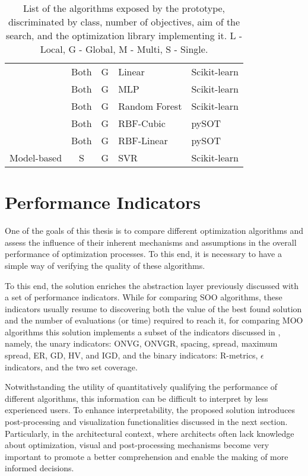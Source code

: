 \begin{table}[]
\begin{tabular}{cccll}
		& Both & G & Linear & Scikit-learn \\
		& Both & G & MLP & Scikit-learn \\
		& Both & G & Random Forest & Scikit-learn \\
		& Both & G & RBF-Cubic & pySOT \\
		& Both & G & RBF-Linear & pySOT \\
		\multirow{-10}{*}{Model-based} & S & G & SVR & Scikit-learn
	\end{tabular}
	\caption[List of the algorithms exposed by the solution's prototype]{List of the algorithms exposed by the prototype, discriminated by class, number of objectives, aim of the search, and the optimization library implementing it. L - Local, G - Global, M - Multi, S - Single.}
	\label{table:algorithms}
\end{table}

\section{Performance Indicators}

One of the goals of this thesis is to compare different optimization algorithms and assess the influence of their inherent mechanisms and assumptions in the overall performance of optimization processes. To this end, it is necessary to have a simple way of verifying the quality of these algorithms. 

To this end, the solution enriches the abstraction layer previously discussed with a set of performance indicators. While for comparing \ac{SOO} algorithms, these indicators usually resume to discovering both the value of the best found solution and the number of evaluations (or time) required to reach it, for comparing \ac{MOO} algorithms this solution implements a subset of the indicators discussed in , namely, the unary indicators: \ac{ONVG}, \ac{ONVGR}, spacing, spread, maximum spread, \ac{ER}, \ac{GD}, \ac{HV}, and \ac{IGD}, and the binary indicators: R-metrics, $\epsilon$ indicators, and the two set coverage.

Notwithstanding the utility of quantitatively qualifying the performance of different algorithms, this information can be difficult to interpret by less experienced users. To enhance interpretability, the proposed solution introduces post-processing and visualization functionalities discussed in the next section. Particularly, in the architectural context, where architects often lack knowledge about optimization, visual and post-processing mechanisms become very important to promote a better comprehension and enable the making of more informed decisions. 

